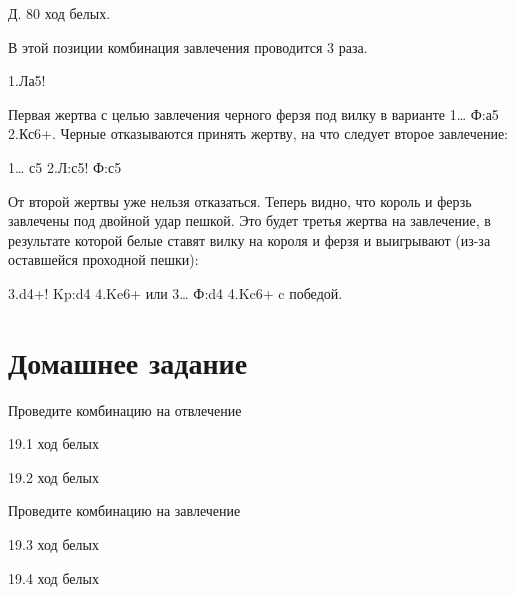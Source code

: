 Д. 80 ход белых.

В этой позиции комбинация завлечения проводится 3 раза.

1.Ла5!

Первая жертва с целью завлечения черного ферзя под вилку в варианте 1… Ф:а5 2.Кс6+. Черные отказываются принять жертву, на что следует второе завлечение:

1… с5 2.Л:с5! Ф:с5

От второй жертвы уже нельзя отказаться. Теперь видно, что король и ферзь завлечены под двойной удар пешкой. Это будет третья жертва на завлечение, в результате которой белые ставят вилку на короля и ферзя и выигрывают (из-за оставшейся проходной пешки):

3.d4+! Kp:d4 4.Ke6+ или 3… Ф:d4 4.Kc6+ c победой.

\section{Домашнее задание}

Проведите комбинацию на отвлечение
 
 
19.1 ход белых
 
19.2 ход белых
 
Проведите комбинацию на завлечение
 
 
19.3 ход белых
 
19.4 ход белых
 
